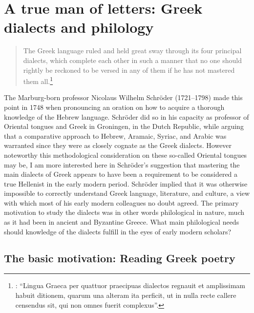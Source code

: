 \chapter{A true man of letters: Greek dialects and philology}\label{chap:3}
\begin{quote}
The Greek language ruled and held great sway through its four principal dialects, which complete each other in such a manner that no one should rightly be reckoned to be versed in any of them if he has not mastered them all.\footnote{\citet[53--54]{Schroeder1748}: “Lingua Graeca per quattuor praecipuas dialectos regnauit et amplissimam habuit ditionem, quarum una alteram ita perficit, ut in nulla recte callere censendus sit, qui non omnes fuerit complexus”.}
\end{quote}

The Marburg-born professor Nicolaus Wilhelm Schröder (1721–1798) made this point in 1748 when pronouncing an oration on how to acquire a thorough knowledge of the Hebrew language. Schröder did so in his capacity as professor of Oriental tongues and Greek in Groningen, in the Dutch Republic, while arguing that a comparative approach to Hebrew, Aramaic, Syriac, and Arabic was warranted since they were as closely cognate as the Greek dialects. However noteworthy this methodological consideration on these so-called Oriental tongues may be, I am more interested here in Schröder’s suggestion that mastering the main dialects of Greek appears to have been a requirement to be considered a true Hellenist in the early modern period. Schröder implied that it was otherwise impossible to correctly understand Greek language, literature, and culture, a view with which most of his early modern colleagues no doubt agreed. The primary motivation to study the dialects was in other words philological in nature, much as it had been in ancient and Byzantine Greece. What main philological needs should knowledge of the dialects fulfill in the eyes of early modern scholars?

\section{The basic motivation: Reading Greek poetry}\label{sec:3.1}


